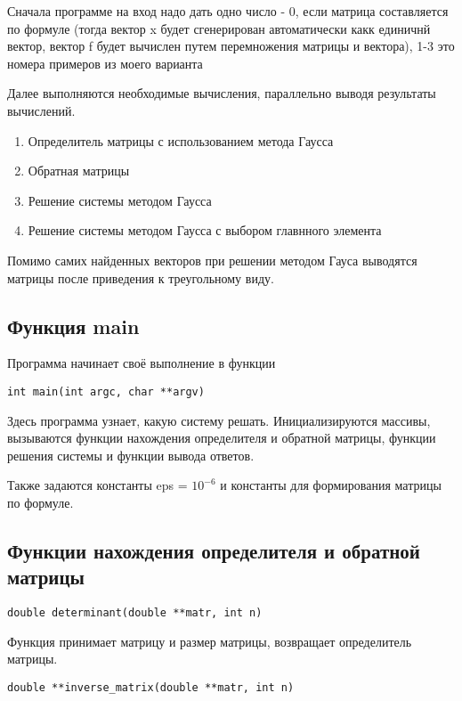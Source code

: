 \documentclass[a4paper,12pt,titlepage,finall]{article}
\begin{document}
Сначала программе на вход надо дать одно число - 0, если матрица составляется по формуле (тогда вектор x будет сгенерирован автоматически какк единичнй вектор, вектор f будет вычислен путем перемножения матрицы и вектора), 1-3 это номера примеров из моего варианта

Далее выполняются необходимые вычисления, параллельно выводя результаты вычислений.

\begin{enumerate}
    \item Определитель матрицы с использованием метода Гаусса
    \item Обратная матрицы 
    \item Решение системы методом Гаусса
    \item Решение системы методом Гаусса с выбором главнного элемента
\end{enumerate}

Помимо самих найденных векторов при решении методом Гауса выводятся матрицы после приведения к треугольному виду.

\subsection{Функция main}
Программа начинает своё выполнение в функции
\begin{verbatim}
int main(int argc, char **argv)
\end{verbatim}

Здесь программа узнает, какую систему решать. Инициализируются массивы, вызываются функции нахождения определителя и обратной матрицы, функции решения системы и функции вывода ответов.


Также задаются константы eps = $10^{-6}$ и константы для формирования матрицы по формуле.


\subsection{Функции нахождения определителя и обратной матрицы}

\begin{verbatim}
double determinant(double **matr, int n)
\end{verbatim}

Функция принимает матрицу и размер матрицы, возвращает определитель матрицы.

\begin{verbatim}
double **inverse_matrix(double **matr, int n)
\end{verbatim}
\end{document}
